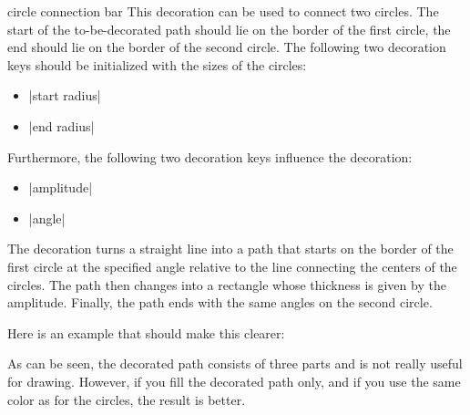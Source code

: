 \begin{decoration}{circle connection bar}
  This decoration can be used to connect two circles. The start of the
  to-be-decorated path should lie on the border of the first circle,
  the end should lie on the border of the second circle. The following
  two decoration keys should be initialized with the sizes of the circles:
  \begin{itemize}
  \item |start radius|
  \item |end radius|
  \end{itemize}
  Furthermore, the following two decoration keys influence the decoration:
  \begin{itemize}
  \item |amplitude|
  \item |angle|
  \end{itemize}
  The decoration turns a straight line into a path that starts on the border of the
  first circle at the specified angle relative to the line connecting
  the centers of the circles. The path then changes into a rectangle
  whose thickness is given by the amplitude. Finally, the path ends
  with the same angles on the second circle. 

  Here is an example that should make this clearer:
\begin{codeexample}[]
\end{codeexample}

  As can be seen, the decorated path consists of three parts and is not really
  useful for drawing. However, if you fill the decorated path only, and if you
  use the same color as for the circles, the result is better.
\begin{codeexample}[]
\end{codeexample}


\end{decoration}
